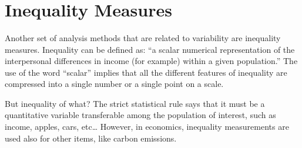 \documentclass[
]{svmono}
\newenvironment{Shaded}{\begin{snugshade}}{\end{snugshade}}
\newcommand{\AttributeTok}[1]{\textcolor[rgb]{0.13,0.29,0.53}{#1}}
\newcommand{\CommentTok}[1]{\textcolor[rgb]{0.56,0.35,0.01}{\textit{#1}}}
\newcommand{\DecValTok}[1]{\textcolor[rgb]{0.00,0.00,0.81}{#1}}
\newcommand{\FunctionTok}[1]{\textcolor[rgb]{0.13,0.29,0.53}{\textbf{#1}}}
\newcommand{\NormalTok}[1]{#1}
\newcommand{\SpecialCharTok}[1]{\textcolor[rgb]{0.81,0.36,0.00}{\textbf{#1}}}
\newcommand{\StringTok}[1]{\textcolor[rgb]{0.31,0.60,0.02}{#1}}
\begin{document}
\begin{Shaded}
\end{Shaded}

~

~

~

\hypertarget{inequality-measures}{%
\section{Inequality Measures}\label{inequality-measures}}

Another set of analysis methods that are related to variability are
inequality measures. Inequality can be defined as: ``a scalar numerical
representation of the interpersonal differences in income (for example)
within a given population.'' The use of the word ``scalar'' implies that
all the different features of inequality are compressed into a single
number or a single point on a scale.

But inequality of what? The strict statistical rule says that it must be
a quantitative variable transferable among the population of interest,
such as income, apples, cars, etc\ldots{} However, in economics, inequality
measurements are used also for other items, like carbon emissions.
\end{document}
